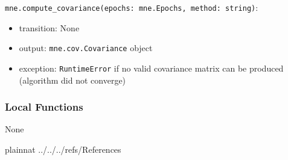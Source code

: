 \documentclass[12pt, titlepage]{article}
\begin{document}
\noindent \lstinline|mne.compute_covariance(epochs: mne.Epochs, method: string)|:
\begin{itemize}
    \item transition: None
    \item output: \lstinline|mne.cov.Covariance| object
    \item exception: \lstinline|RuntimeError| if no valid covariance matrix can be produced (algorithm did not converge)
\end{itemize}


\subsubsection{Local Functions}


None


\newpage








 {plainnat}
 {../../../refs/References}


\newpage
\end{document}
